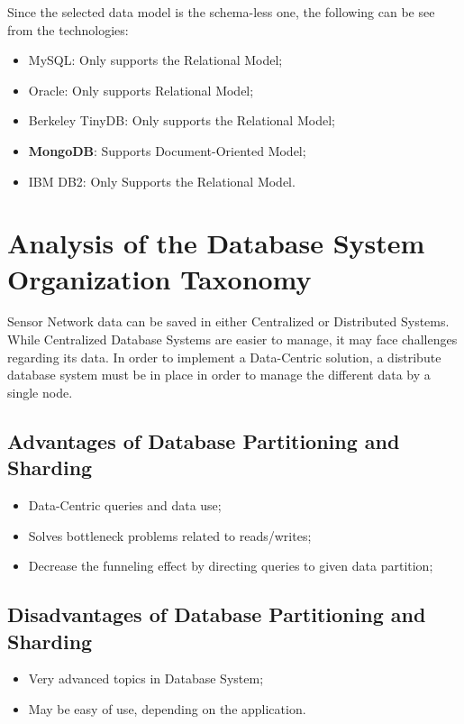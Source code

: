 Since the selected data model is the schema-less one, the following can be see
from the technologies:

\begin{itemize}
  \item MySQL: Only supports the Relational Model;
  \item Oracle: Only supports Relational Model;
  \item Berkeley TinyDB: Only supports the Relational Model; 
  \item \textbf{MongoDB}: Supports Document-Oriented Model;
  \item IBM DB2: Only Supports the Relational Model.
\end{itemize}

\section{Analysis of the Database System Organization Taxonomy}

Sensor Network data can be saved in either Centralized or Distributed Systems.
While Centralized Database Systems are easier to manage, it may
face challenges regarding its data. In order to implement a Data-Centric
solution, a distribute database system must be in place in order to manage
the different data by a single node.

\subsection{Advantages of Database Partitioning and Sharding}

\begin{itemize}
  \item Data-Centric queries and data use;
  \item Solves bottleneck problems related to reads/writes;
  \item Decrease the funneling effect by directing queries to given data
  partition;
\end{itemize}

\subsection{Disadvantages of Database Partitioning and Sharding}

\begin{itemize}
  \item Very advanced topics in Database System;
  \item May be easy of use, depending on the application.
\end{itemize}

